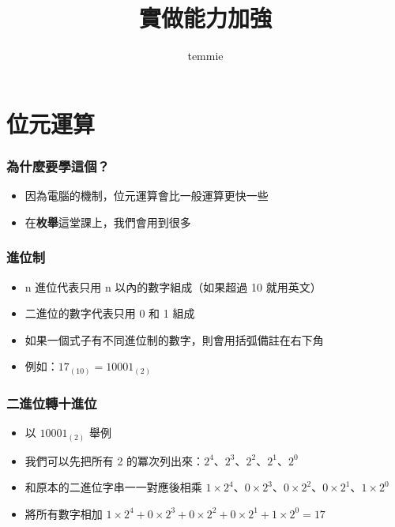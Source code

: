 \documentclass{beamer}
\title{實做能力加強}
\author{temmie}
\date{}
\begin{document}
\begin{frame}
    \titlepage
\end{frame}

\begin{frame}
    \tableofcontents
\end{frame}

\section{位元運算}

\begin{frame}
    \frametitle{為什麼要學這個？}
    \begin{itemize}
        \item 因為電腦的機制，位元運算會比一般運算更快一些
        \item 在\textbf{枚舉}這堂課上，我們會用到很多
    \end{itemize}
\end{frame}

\begin{frame}
    \frametitle{進位制}
    \begin{itemize}
        \item n 進位代表只用 n 以內的數字組成（如果超過 10 就用英文）
        \item 二進位的數字代表只用 0 和 1 組成
        \item<2-> 如果一個式子有不同進位制的數字，則會用括弧備註在右下角
        \item<2-> 例如：$17_{(10)}=10001_{(2)}$
    \end{itemize}
\end{frame}

\begin{frame}
    \frametitle{二進位轉十進位}
    \begin{itemize}
        \item 以 $10001_{(2)}$ 舉例
        \item 我們可以先把所有 2 的冪次列出來：$2^4$、$2^3$、$2^2$、$2^1$、$2^0$
        \item<2-> 和原本的二進位字串一一對應後相乘
        $1\times 2^4$、$0\times 2^3$、$0\times 2^2$、$0\times 2^1$、$1\times 2^0$
        \item<3-> 將所有數字相加
        $1\times 2^4+0\times 2^3+0\times 2^2+0\times 2^1+1\times 2^0=17$
    \end{itemize}
\end{frame}
\end{document}

